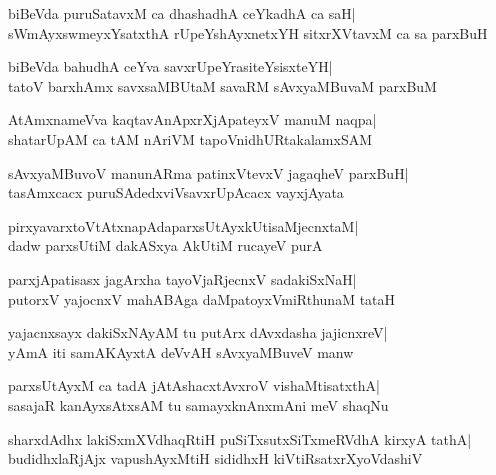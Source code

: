 \documentclass[twoside,12pt,openright]{book}
\newcounter{shloka}[chapter]
\begin{document}
\begin{shloka}%
biBeVda puruSatavxM ca dhashadhA ceYkadhA ca saH|\\
sWmAyxswmeyxYsatxthA rUpeYshAyxnetxYH sitxrXVtavxM ca sa parxBuH
\end{shloka}

\begin{shloka}%
biBeVda bahudhA ceYva savxrUpeYrasiteYsisxteYH|\\
tatoV barxhAmx savxsaMBUtaM savaRM sAvxyaMBuvaM parxBuM
\end{shloka}

\begin{shloka}%
AtAmxnameVva kaqtavAnApxrXjApateyxV manuM naqpa|\\
shatarUpAM ca tAM nAriVM tapoVnidhURtakalamxSAM
\end{shloka}

\begin{shloka}%
sAvxyaMBuvoV manunARma patinxVtevxV jagaqheV parxBuH|\\
tasAmxcacx puruSAdedxviVsavxrUpAcacx vayxjAyata
\end{shloka}

\begin{shloka}%
pirxyavarxtoVtAtxnapAdaparxsUtAyxkUtisaMjecnxtaM|\\
dadw parxsUtiM dakASxya AkUtiM rucayeV purA
\end{shloka}

\begin{shloka}%
parxjApatisasx jagArxha tayoVjaRjecnxV sadakiSxNaH|\\
putorxV yajocnxV mahABAga daMpatoyxVmiRthunaM tataH
\end{shloka}

\begin{shloka}%
yajacnxsayx dakiSxNAyAM tu putArx dAvxdasha jajicnxreV|\\
yAmA iti samAKAyxtA deVvAH sAvxyaMBuveV manw
\end{shloka}

\begin{shloka}%
parxsUtAyxM ca tadA jAtAshacxtAvxroV vishaMtisatxthA|\\
sasajaR kanAyxsAtxsAM tu samayxknAnxmAni meV shaqNu
\end{shloka}

\begin{shloka}%
sharxdAdhx lakiSxmXVdhaqRtiH puSiTxsutxSiTxmeRVdhA kirxyA tathA|\\
budidhxlaRjAjx vapushAyxMtiH sididhxH kiVtiRsatxrXyoVdashiV
\end{shloka}
\end{document}
